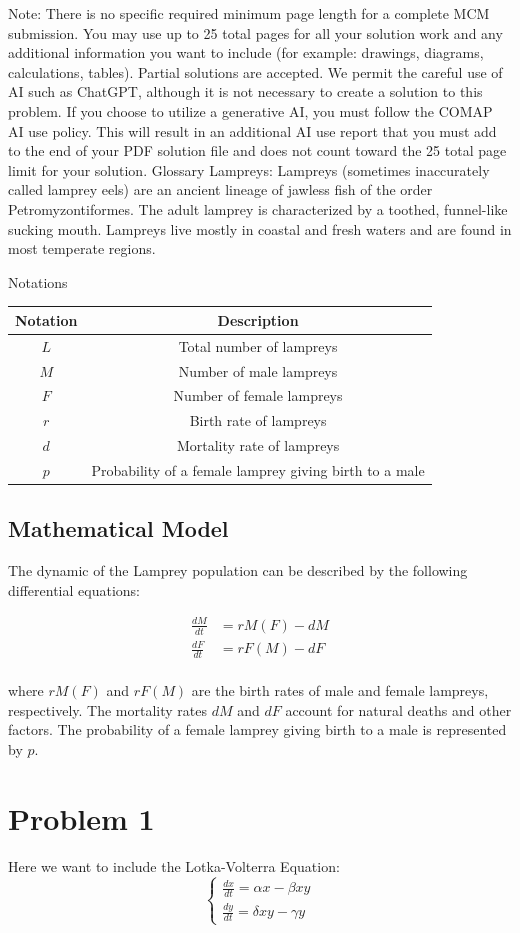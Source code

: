 \documentclass[12pt]{article}
\begin{document}
Note: There is no specific required minimum page length for a complete MCM submission. You
may use up to 25 total pages for all your solution work and any additional information you want
to include (for example: drawings, diagrams, calculations, tables). Partial solutions are accepted.
We permit the careful use of AI such as ChatGPT, although it is not necessary to create a solution
to this problem. If you choose to utilize a generative AI, you must follow the COMAP AI use
policy. This will result in an additional AI use report that you must add to the end of your PDF
solution file and does not count toward the 25 total page limit for your solution.
Glossary
Lampreys: Lampreys (sometimes inaccurately called lamprey eels) are an ancient lineage of
jawless fish of the order Petromyzontiformes. The adult lamprey is characterized by a toothed,
funnel-like sucking mouth. Lampreys live mostly in coastal and fresh waters and are found in
most temperate regions.


Notations
\begin{center}
\begin{tabular}{|c|c|}
\hline
Notation & Description \\
\hline
$L$ & Total number of lampreys \\
$M$ & Number of male lampreys \\
$F$ & Number of female lampreys \\
$r$ & Birth rate of lampreys \\
$d$ & Mortality rate of lampreys \\
$p$ & Probability of a female lamprey giving birth to a male \\
\hline
\end{tabular}
\end{center}


\subsection{Mathematical Model}

The dynamic of the Lamprey population can be described by the following differential equations:

\begin{align*}
\frac{dM}{dt} &= rM(F) - dM \\
\frac{dF}{dt} &= rF(M) - dF \\
\end{align*}

where $rM(F)$ and $rF(M)$ are the birth rates of male and female lampreys, respectively. The
mortality rates $dM$ and $dF$ account for natural deaths and other factors. The probability of a
female lamprey giving birth to a male is represented by $p$.


\section{Problem 1}

Here we want to include the Lotka-Volterra Equation:
\[
\begin{cases}
\frac{dx}{dt} = \alpha x - \beta xy \\
\frac{dy}{dt} = \delta xy - \gamma y
\end{cases}
\]

\end{document}
